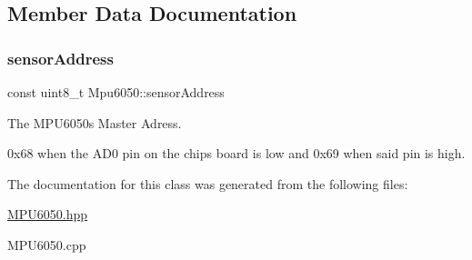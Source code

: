 \subsection{Member Data Documentation}
\mbox{\label{classMpu6050_ac95dd79bde2892d4a12778f1a436d004}} 
\subsubsection{\texorpdfstring{sensor\+Address}{sensorAddress}}
{\footnotesize\ttfamily const uint8\+\_\+t Mpu6050\+::sensor\+Address\hspace{0.3cm}{\ttfamily [private]}}



The M\+P\+U6050\textquotesingle{}s Master Adress. 

0x68 when the A\+D0 pin on the chip\textquotesingle{}s board is low and 0x69 when said pin is high. 

The documentation for this class was generated from the following files\+:\begin{DoxyCompactItemize}
\item 
\hyperlink{MPU6050_8hpp}{M\+P\+U6050.\+hpp}\item 
M\+P\+U6050.\+cpp\end{DoxyCompactItemize}
